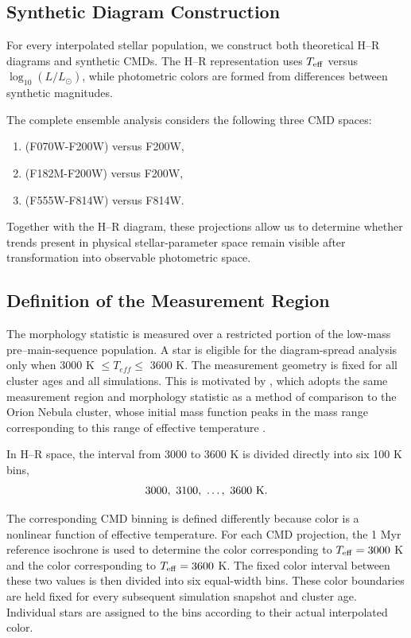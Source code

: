 \documentclass[linenumbers, twocolumn]{aastex631}
\begin{document}
\subsection{Synthetic Diagram Construction}

For every interpolated stellar population, we construct both theoretical H--R diagrams and synthetic CMDs. The H--R representation uses $T_{\rm eff}$ versus $\log_{10}(L/L_\odot)$,
while photometric colors are formed from differences between synthetic magnitudes.

The complete ensemble analysis considers the following three CMD spaces: 

\begin{enumerate}
    \item (F070W-F200W) versus F200W, 
    \item (F182M-F200W) versus F200W,
    \item (F555W-F814W) versus F814W.
\end{enumerate}

Together with the H--R diagram, these projections allow us to determine whether trends present in physical stellar-parameter space remain visible after transformation into observable photometric space.

\subsection{Definition of the Measurement Region}
\label{sec:measurement-region}

The morphology statistic is measured over a restricted portion of the low-mass pre--main-sequence population. A star is eligible for the diagram-spread analysis only when 3000 K $\leq T_{ eff} \leq$ 3600 K. The measurement geometry is fixed for all cluster ages and all simulations. This is motivated by \citet{Masegian2021}, which adopts the same measurement region and morphology statistic as a method of comparison to the Orion Nebula cluster, whose initial mass function peaks in the mass range corresponding to this range of effective temperature \citep{DaRio2016}. 

In H--R space, the interval from 3000 to 3600 K is divided directly into six 100 K bins,
\begin{equation}
3000,\ 3100,\ \ldots,\ 3600\ {\rm K}.
\end{equation}

The corresponding CMD binning is defined differently because color is a nonlinear function of effective temperature. For each CMD projection, the 1 Myr reference isochrone is used to determine the color corresponding to $T_{\rm eff}=3000$ K and the color corresponding to $T_{\rm eff}=3600$ K. The fixed color interval between these two values is then divided into six equal-width bins. These color boundaries are held fixed for every subsequent simulation snapshot and cluster age. Individual stars are assigned to the bins according to their actual interpolated color.
\end{document}
